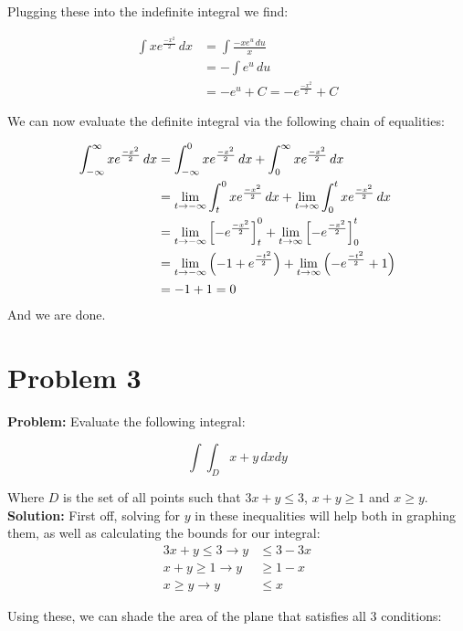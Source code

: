 \documentclass{article}
\begin{document}
Plugging these into the indefinite integral we find:

\begin{align*}
    \int xe^{\frac{-x^2}{2}}\, dx &= \int \frac{-xe^u\, du}{x}\\
    &= -\int e^u\, du\\
    &=-e^u+C=-e^{\frac{-x^2}{2}}+C
\end{align*}

We can now evaluate the definite integral via the following chain of equalities:

\begin{align*}
    \int_{-\infty}^\infty xe^{\frac{-x^2}{2}}\, dx&=\int_{-\infty}^0 xe^{\frac{-x^2}{2}}\, dx+\int_0^\infty xe^{\frac{-x^2}{2}}\, dx\\
    &=\lim_{t\to-\infty}\int_t^0 xe^{\frac{-x^2}{2}}\, dx+\lim_{t\to\infty}\int_0^t xe^{\frac{-x^2}{2}}\, dx\\
    &=\lim_{t\to-\infty}\left[-e^{\frac{-x^2}{2}}\right]_{t}^{0}+\lim_{t\to\infty}\left[-e^{\frac{-x^2}{2}}\right]_{0}^{t}\\
    &=\lim_{t\to-\infty}\left(-1+e^{\frac{-t^2}{2}}\right)+\lim_{t\to\infty}\left(-e^{\frac{-t^2}{2}}+1\right)\\
    &=-1+1=0
\end{align*}
\indent And we are done.

\section*{Problem 3}
\noindent\textbf{Problem:} Evaluate the following integral:

$$\int\int_D x+y\,dxdy$$

Where $D$ is the set of all points such that $3x+y\le 3$, $x+y\ge 1$ and $x\ge y$.
\\

\noindent\textbf{Solution:} First off, solving for $y$ in these inequalities will help both in graphing them, as well as calculating the bounds for our integral:
\begin{align*}
    3x+y\le 3\rightarrow y&\le 3-3x\\
    x+y\ge 1\rightarrow y&\ge 1-x\\
    x\ge y\rightarrow y&\le x
\end{align*}

Using these, we can shade the area of the plane that satisfies all 3 conditions:
\end{document}
